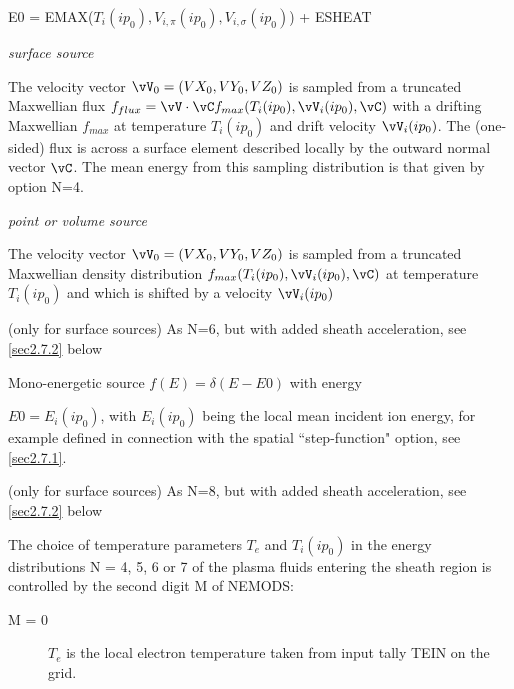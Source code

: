 \begin{description}
\begin{description}
                E0 = EMAX($T_i(ip_0),V_{i,\pi}(ip_0),V_{i,\sigma}(ip_0)$) + ESHEAT
          \item[N = 6]

                \emph{surface source} 

                The velocity vector $\vV_0 = (VX_0,VY_0,VZ_0)$ is sampled from a truncated
                Maxwellian flux $f_{flux}= \vV \cdot \vC f_{max} (T_i(ip_0),\vV_i(ip_0), \vC )$
                with a drifting Maxwellian $f_{max}$ at temperature $ T_i(ip_0) $ and drift
                velocity $\vV_i(ip_0) $.
                The (one-sided) flux is across a surface element described locally by the
                outward normal vector $\vC $.
                The mean energy from this sampling distribution is that given by option N=4.

                \emph{point or volume source} 

                The velocity vector $\vV_0 = (VX_0,VY_0,VZ_0)$ is sampled from a truncated
                Maxwellian density distribution $f_{max} (T_i(ip_0),\vV_i(ip_0), \vC )$ at
                temperature $ T_i(ip_0) $ and which is shifted by a velocity $\vV_i(ip_0) $

          \item[N = 7] (only for surface sources) As N=6, but with added sheath
                acceleration, see \cref{sec2.7.2} below 

          \item[N = 8] Mono-energetic source $f(E) = \delta (E-E0)$ with energy

                $E0 = E_i(ip_0)$, with $E_i(ip_0)$ being the local mean incident ion energy,
                for example defined in connection with the spatial ``step-function" option, see
                \cref{sec2.7.1}.
          \item[N = 9] (only for surface sources) As N=8, but with added sheath
                acceleration, see \cref{sec2.7.2} below
        \end{description}
        The choice of
        temperature parameters $T_e$ and $T_i(ip_0)$ in the energy distributions N = 4,
        5, 6 or 7 of the plasma fluids entering the sheath region is controlled by the
        second digit M of NEMODS:
        \begin{description}
          \item[M = 0] $T_e$ is the local electron temperature taken from input tally
                TEIN on the grid.


\end{description}
\end{description}
